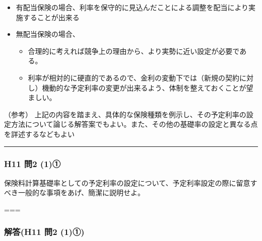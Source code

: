 \documentclass[
]{article}
\providecommand{\tightlist}{%
  \setlength{\itemsep}{0pt}\setlength{\parskip}{0pt}}
\begin{document}
\begin{itemize}
\tightlist
\item
  有配当保険の場合、利率を保守的に見込んだことによる調整を配当により実施することが出来る
\item
  無配当保険の場合、

  \begin{itemize}
  \tightlist
  \item
    合理的に考えれば競争上の理由から、より実勢に近い設定が必要である。
  \item
    利率が相対的に硬直的であるので、金利の変動下では（新規の契約に対し）機動的な予定利率の変更が出来るよう、体制を整えておくことが望ましい。
  \end{itemize}
\end{itemize}

（参考）
上記の内容を踏まえ、具体的な保険種類を例示し、その予定利率の設定方法について論じる解答案でもよい。また、その他の基礎率の設定と異なる点を詳述するなどもよい

\begin{center}\rule{0.5\linewidth}{0.5pt}\end{center}

\hypertarget{h11-ux554f2-1ux2460}{%
\subsubsection{H11 問2 (1)①}\label{h11-ux554f2-1ux2460}}

保険料計算基礎率としての予定利率の設定について、予定利率設定の際に留意すべき一般的な事項をあげ、簡潔に説明せよ。

===

\hypertarget{ux89e3ux7b54h11-ux554f2-1ux2460}{%
\subsubsection{解答(H11 問2
(1)①)}\label{ux89e3ux7b54h11-ux554f2-1ux2460}}
\end{document}

